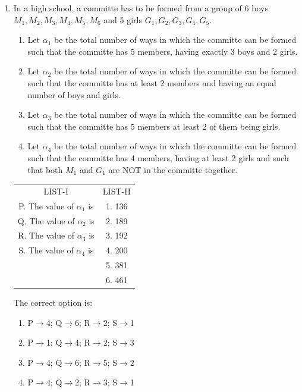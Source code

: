 \begin{enumerate}[label=\arabic*.,ref=\thesubsection.\theenumi]
\item In a high school, a committe has to be formed from a group of 6 boys $M_1,M_2,M_3,M_4,M_5,M_6$ and 5 girls $G_1,G_2,G_3,G_4,G_5.$
\begin{enumerate}
\item Let $\alpha_1$ be the total number of ways in which the committe can be formed such that the committe has 5 members, having exactly 3 boys and 2 girls.
\item Let $\alpha_2$ be the total number of ways in which the committe can be formed such that the committe has at least 2 members and having an equal number of boys and girls.
\item Let $\alpha_3$ be the total number of ways in which the committe can be formed such that the committe has 5 members at least 2 of them being girls.
\item Let $\alpha_4$ be the total number of ways in which the committe can be formed such that the committe has 4 members, having at least 2 girls and such that both $M_1$ and $G_1$ are NOT in the committe together.
\end{enumerate}
\begin{table}[h!]
\centering
\begin{tabular}{c c} 
 LIST-I & LIST-II\\ [0.5ex] 
 P. The value of $\alpha_1$ is & 1. 136 \\ 
 Q. The value of $\alpha_2$ is & 2. 189\\
 R. The value of $\alpha_3$ is & 3. 192\\
 S. The value of $\alpha_4$ is & 4. 200\\
 & 5. 381\\
 & 6. 461\\ [1ex] 
\end{tabular}
\end{table}
The correct option is:\\
\begin{enumerate}
\item P$\rightarrow$4; Q$\rightarrow$6; R$\rightarrow$2; S$\rightarrow$1
\item P$\rightarrow$1; Q$\rightarrow$4; R$\rightarrow$2; S$\rightarrow$3
\item P$\rightarrow$4; Q$\rightarrow$6; R$\rightarrow$5; S$\rightarrow$2
\item P$\rightarrow$4; Q$\rightarrow$2; R$\rightarrow$3; S$\rightarrow$1
\end{enumerate}

\end{enumerate}
